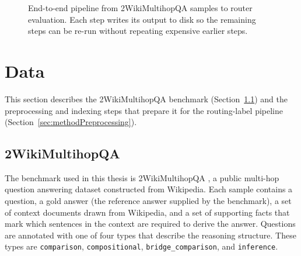 \documentclass[english, bibtex]{kththesis}               %
\numberwithin{listing}{chapter}
\begin{document}
\begin{figure}[!ht]
\centering
{}
\caption{End-to-end pipeline from 2WikiMultihopQA samples to router evaluation. Each step writes its output to disk so the remaining steps can be re-run without repeating expensive earlier steps.}
\label{fig:methodPipeline}
\end{figure}

\section{Data}
\label{sec:methodData}

This section describes the 2WikiMultihopQA benchmark (Section~\ref{sec:method2wiki}) and the preprocessing and indexing steps that prepare it for the routing-label pipeline (Section~\ref{sec:methodPreprocessing}).

\subsection{2WikiMultihopQA}
\label{sec:method2wiki}

The benchmark used in this thesis is 2WikiMultihopQA \cite{ho2020twowiki}, a public multi-hop question answering dataset constructed from Wikipedia. Each sample contains a question, a gold answer (the reference answer supplied by the benchmark), a set of context documents drawn from Wikipedia, and a set of supporting facts that mark which sentences in the context are required to derive the answer. Questions are annotated with one of four types that describe the reasoning structure. These types are \texttt{comparison}, \texttt{compositional}, \texttt{bridge\_comparison}, and \texttt{inference}.
\end{document}
